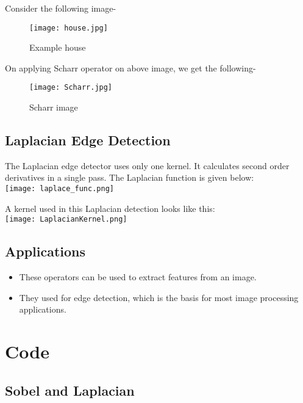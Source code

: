 \documentclass[]{article}
\providecommand{\tightlist}{%
  \setlength{\itemsep}{0pt}\setlength{\parskip}{0pt}}
\begin{document}
Consider the following image-

\begin{figure}[htbp]
\centering
\texttt{[image: house.jpg]}
\caption{Example house}
\end{figure}

On applying Scharr operator on above image, we get the following-

\begin{figure}[htbp]
\centering
\texttt{[image: Scharr.jpg]}
\caption{Scharr image}
\end{figure}

\subsection{Laplacian Edge Detection}\label{laplacian-edge-detection}

The Laplacian edge detector uses only one kernel. It calculates second
order derivatives in a single pass. The Laplacian function is given
below:\\
\texttt{[image: laplace\_func.png]}

A kernel used in this Laplacian detection looks like this:\\
\texttt{[image: LaplacianKernel.png]}

\subsection{Applications}\label{applications}

\begin{itemize}
\tightlist
\item
  These operators can be used to extract features from an image.
\item
  They used for edge detection, which is the basis for most image
  processing applications.
\end{itemize}

\section{Code}\label{code}

\subsection{Sobel and Laplacian}\label{sobel-and-laplacian}
\end{document}
